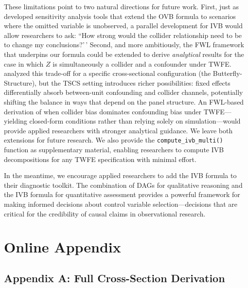 \documentclass[
]{article}
\begin{document}
These limitations point to two natural directions for future work.
First, just as \citet{cinelli2020making} developed sensitivity analysis
tools that extend the OVB formula to scenarios where the omitted
variable is unobserved, a parallel development for IVB would allow
researchers to ask: ``How strong would the collider relationship need to
be to change my conclusions?'\,' Second, and more ambitiously, the FWL
framework that underpins our formula could be extended to derive
\textit{analytical} results for the case in which \(Z\) is
simultaneously a collider and a confounder under TWFE.
\citet{ding2015adjust} analyzed this trade-off for a specific
cross-sectional configuration (the Butterfly-Structure), but the TSCS
setting introduces richer possibilities: fixed effects differentially
absorb between-unit confounding and collider channels, potentially
shifting the balance in ways that depend on the panel structure. An
FWL-based derivation of when collider bias dominates confounding bias
under TWFE---yielding closed-form conditions rather than relying solely
on simulation---would provide applied researchers with stronger
analytical guidance. We leave both extensions for future research. We
also provide the \texttt{compute\_ivb\_multi()} function as
supplementary material, enabling researchers to compute IVB
decompositions for any TWFE specification with minimal effort.

In the meantime, we encourage applied researchers to add the IVB formula
to their diagnostic toolkit. The combination of DAGs for qualitative
reasoning and the IVB formula for quantitative assessment provides a
powerful framework for making informed decisions about control variable
selection---decisions that are critical for the credibility of causal
claims in observational research.

\singlespacing



\newpage
\doublespacing
\appendix
\setcounter{figure}{0}
\setcounter{table}{0}
\renewcommand{\thefigure}{A\arabic{figure}}
\renewcommand{\thetable}{A\arabic{table}}

\section{Online Appendix}\label{online-appendix}

\subsection{\texorpdfstring{Appendix A: Full Cross-Section Derivation
\label{app:cs}}{Appendix A: Full Cross-Section Derivation }}\label{appendix-a-full-cross-section-derivation}
\end{document}
